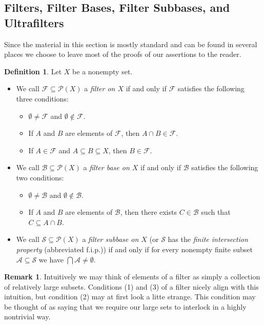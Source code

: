 \documentclass[12pt]{article}
\theoremstyle{plain}
\theoremstyle{definition}
\newtheorem{defn}[thm]{Definition}
\newtheorem{rmk}[thm]{Remark}
\newcommand{\calA}{\mathcal{A}}
\newcommand{\calB}{\mathcal{B}}
\newcommand{\calF}{\mathcal{F}}
\newcommand{\calP}{\mathcal{P}}
\newcommand{\calS}{\mathcal{S}}
\begin{document}
\subsection{Filters, Filter Bases, Filter Subbases, and Ultrafilters}
Since the material in this section is mostly standard and can be found in several places we choose to leave most of the proofs of our assertions to the reader.
\begin{defn}
  \label{defn:filters}
  Let $X$ be a nonempty set.
  \begin{itemize}
    \item[(a)] We call $\calF \subseteq \calP(X)$ a \textsl{filter on $X$} if and only if $\calF$ satisfies the following three conditions:
    \begin{itemize}
      \item[(1)] $\emptyset \ne \calF$ and $\emptyset \not\in\calF$.
      \item[(2)] If $A$ and $B$ are elements of $\calF$, then $A
        \cap B \in \calF$.
      \item[(3)] If $A \in \calF$ and $A \subseteq B \subseteq X$,
        then $B \in \calF$.
    \end{itemize}

    \item[(b)] We call $\calB \subseteq \calP(X)$ a \textsl{filter base on $X$} if and only if $\calB$ satisfies the following two conditions:
    \begin{itemize}
      \item[(1)] $\emptyset \ne \calB$ and $\emptyset \not\in \calB$.
        
      \item[(2)] If $A$ and $B$ are elements of $\calB$, then there exists $C \in \calB$ such that $C \subseteq A \cap B$.
    \end{itemize}

    \item[(c)] We call $\calS \subseteq \calP(X)$ a \textsl{filter subbase on $X$} (or $\calS$ has the \textsl{finite intersection property} (abbreviated f.i.p.)) if and only if for every nonempty finite subset $\calA \subseteq \calS$ we have $\bigcap \calA \ne \emptyset$.
  \end{itemize}
\end{defn}
\begin{rmk}
  Intuitively we may think of elements of a filter as simply a collection of relatively large subsets.
  Conditions (1) and (3) of a filter nicely align with this intuition, but condition (2) may at first look a litte strange.
  This condition may be thought of as saying that we require our large sets to interlock in a highly nontrivial way.%
\end{rmk}
\end{document}
